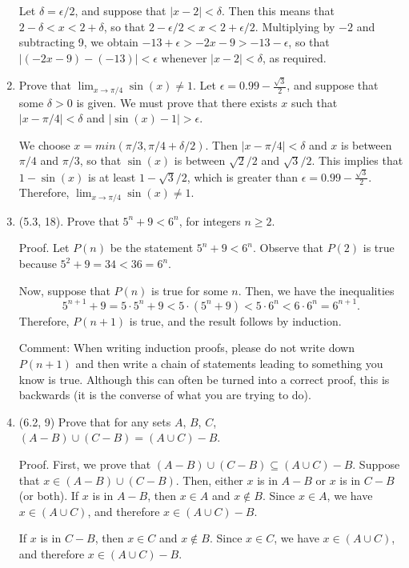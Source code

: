 \documentclass[12pt]{amsart}
\begin{document}
\begin{enumerate}[1.]
Let $\delta = \epsilon/2$, and suppose that $|x - 2| < \delta$. Then this means that
$2 - \delta < x < 2 + \delta$, so that $2 - \epsilon/2 < x < 2 + \epsilon/2$. Multiplying by
$-2$ and subtracting 9, we obtain $-13 + \epsilon > -2x - 9 > -13 - \epsilon$, so that
$|(-2x - 9) - (-13)| < \epsilon$ whenever $|x - 2| < \delta$, as required.

\item Prove that $\lim_{x \rightarrow \pi/4} \sin(x) \neq 1$.
Let $\epsilon = 0.99 - \frac{\sqrt{3}}{2}$, and suppose that some $\delta > 0$ is given. We must prove that
there exists $x$ such that $|x - \pi/4| < \delta$ and $|\sin(x) - 1| > \epsilon$. 

We choose $x = min(\pi/3, \pi/4 + \delta/2)$. Then $|x - \pi/4| < \delta$ and $x$ is between $\pi/4$ and $\pi/3$,
so that $\sin(x)$ is between $\sqrt{2}/2$ and $\sqrt{3}/2$. This implies that $1 - \sin(x)$ is at least $1 - \sqrt{3}/2$, which
is greater than $\epsilon = 0.99 - \frac{\sqrt{3}}{2}$. Therefore, 
$\lim_{x \rightarrow \pi/4} \sin(x) \neq 1$.

\item(5.3, 18). Prove that $5^n + 9 < 6^n$, for integers $n \geq 2$.

Proof. Let $P(n)$ be the statement $5^n + 9 < 6^n$. Observe that $P(2)$ is true
because $5^2 + 9 = 34 < 36 = 6^n$.

Now, suppose that $P(n)$ is true for some $n$. Then, we have the inequalities
$$
5^{n + 1} + 9 = 5 \cdot 5^n + 9 < 5 \cdot(5^n + 9) < 5 \cdot 6^n < 6 \cdot 6^n = 6^{n + 1}.$$
Therefore, $P(n + 1)$ is true, and the result follows by induction.

Comment: When writing induction proofs, please do not write down $P(n + 1)$ and then write
a chain of statements leading to something you know is true. Although this can often be turned into a
correct proof, this is backwards (it is the converse of what you are trying to do).

\item(6.2, 9) Prove that for any sets $A$, $B$, $C$,
$(A - B) \cup (C - B) = (A \cup C) - B$.

Proof. First, we prove that $(A - B) \cup (C - B)
\subseteq (A \cup C) - B$. Suppose that $x \in (A - B) \cup (C - B)$.
Then, either $x$ is in $A - B$ or $x$ is in $C - B$ (or both).
If $x$ is in $A - B$, then $x \in A$ and $x \not \in B$.
Since $x \in A$, we have $x \in (A \cup C)$, and therefore
$x \in (A \cup C) - B$.

If $x$ is in $C - B$, then $x \in C$ and $x \not \in B$.
Since $x \in C$, we have $x \in(A \cup C)$, and therefore
$x \in (A \cup C) - B$.


\end{enumerate}
\end{document}
